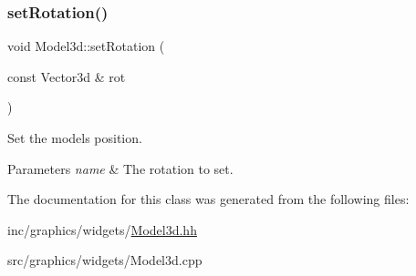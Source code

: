 \subsubsection{\texorpdfstring{set\+Rotation()}{setRotation()}}
{\footnotesize\ttfamily void Model3d\+::set\+Rotation (\begin{DoxyParamCaption}\item[{const Vector3d \&}]{rot }\end{DoxyParamCaption})}



Set the model\textquotesingle{}s position. 


\begin{DoxyParams}{Parameters}
{\em name} & The rotation to set. \\
\hline
\end{DoxyParams}


The documentation for this class was generated from the following files\+:\begin{DoxyCompactItemize}
\item 
inc/graphics/widgets/\hyperlink{Model3d_8hh}{Model3d.\+hh}\item 
src/graphics/widgets/Model3d.\+cpp\end{DoxyCompactItemize}
